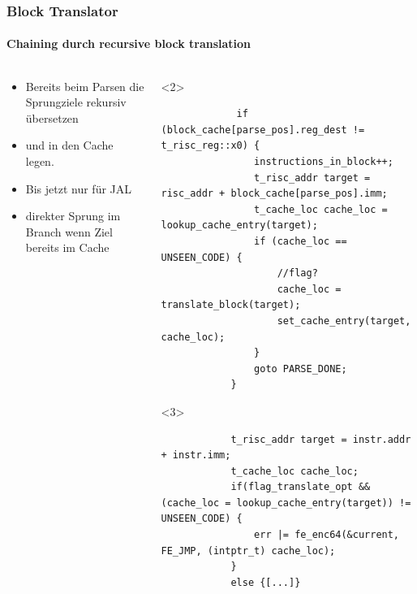 \documentclass[german]{tum-presentation}
\begin{document}
\begin{frame}[fragile]
	\frametitle{Block Translator}
	\framesubtitle{Chaining durch recursive block translation}
	
	\pause
	\begin{columns}
		\begin{column}{0.5\textwidth}
			\vspace{0.25cm}
			\begin{itemize}
				\item Bereits beim Parsen die Sprungziele rekursiv übersetzen
				\item und in den Cache legen.
				\item Bis jetzt nur für JAL
				
				\vspace{1cm}
				
				\item direkter Sprung im Branch wenn Ziel bereits im Cache
			\end{itemize}
		\end{column}

		\begin{column}{0.5\textwidth}
			\begin{onlyenv}
				<2>
				\begin{lstlisting}
			 if (block_cache[parse_pos].reg_dest != t_risc_reg::x0) {
			 	instructions_in_block++;
				t_risc_addr target = risc_addr + block_cache[parse_pos].imm;
				t_cache_loc cache_loc = lookup_cache_entry(target);
				if (cache_loc == UNSEEN_CODE) {
					//flag?
					cache_loc = translate_block(target);
					set_cache_entry(target, cache_loc);
				}
				goto PARSE_DONE;
			}
				\end{lstlisting}
			\end{onlyenv}
			\begin{onlyenv}
				<3>
				\begin{lstlisting}
			t_risc_addr target = instr.addr + instr.imm;
			t_cache_loc cache_loc;
			if(flag_translate_opt && (cache_loc = lookup_cache_entry(target)) != UNSEEN_CODE) {
				err |= fe_enc64(&current, FE_JMP, (intptr_t) cache_loc);
			}
			else {[...]}
				\end{lstlisting}
			\end{onlyenv}
		\end{column}
	\end{columns}
	
\end{frame}
\end{document}
